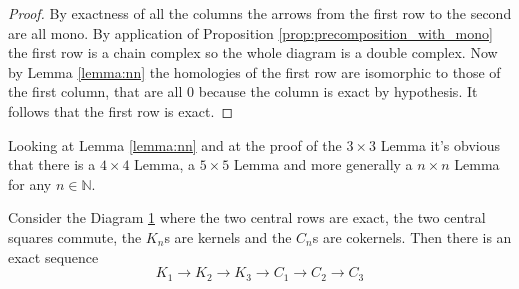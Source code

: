 \begin{proof}
  By exactness of all the columns the arrows from the first row to the second are all mono. By application of Proposition \ref{prop:precomposition_with_mono} the first row is a chain complex so the whole diagram is a double complex. Now by Lemma \ref{lemma:nn} the homologies of the first row are isomorphic to those of the first column, that are all 0 because the column is exact by hypothesis. It follows that the first row is exact.
\end{proof}

\begin{remark}
  \label{rem:lemma_nn}
  Looking at Lemma \ref{lemma:nn} and at the proof of the \(3\times3\) Lemma it's obvious that there is a \(4\times 4\) Lemma, a \(5\times 5\) Lemma and more generally a \(n\times n\) Lemma for any \(n\in\mathbb{N}\).
\end{remark}

\begin{lemma}
  \label{lemma:snake}
  Consider the Diagram \ref{diagram:snake} where the two central rows are exact, the two central squares commute, the \(K_n\)s are kernels and the \(C_n\)s are cokernels. Then there is an exact sequence
  \begin{equation*}
    K_1\to K_2\to K_3\to C_1\to C_2\to C_3
  \end{equation*}
\end{lemma}

\begin{figure}[h]
  \begin{center}
  \end{center}
  \caption{}
  \label{diagram:snake}
\end{figure}

